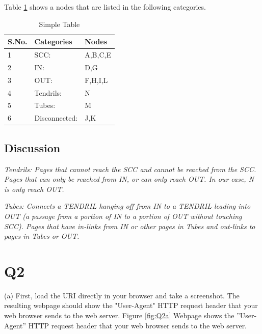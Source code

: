 \documentclass[12pt]{article}
\begin{document}
Table \ref{tbl:simple} shows a nodes that are listed in the following categories.

\begin{table}[h!]
\centering
\caption{Simple Table}
\label{tbl:simple}
\begin{tabular}{|l|l|l|}
\hline
\textbf{S.No.} & \textbf{Categories} & \textbf{Nodes} \\ \hline \hline
1 & SCC: & A,B,C,E  \\ \hline
2 & IN: & D,G \\ \hline
3 & OUT: & F,H,I,L \\ \hline
4 & Tendrils: & N \\ \hline
5 & Tubes: & M  \\ \hline
6 & Disconnected: & J,K \\ \hline
\end{tabular}
\end{table}



\subsection*{Discussion}

\emph{Tendrils: Pages that cannot reach the SCC and cannot be reached from the SCC.
Pages that can only be reached from IN, or can only reach OUT. In our case, N is only reach OUT.
}

\emph{Tubes: Connects a TENDRIL hanging off from IN to a TENDRIL leading into OUT (a passage from a portion of IN to a portion of OUT without touching SCC). Pages that have in-links from IN or other pages in Tubes and out-links to pages in Tubes or OUT.}




\section*{Q2}

(a) First, load the URI directly in your browser and take a screenshot. The resulting webpage should show the "User-Agent" HTTP request header that your web browser sends to the web server. 
Figure \ref{fig:Q2a} Webpage shows the ”User-Agent” HTTP request header that your web browser sends to the web
server.
\end{document}
